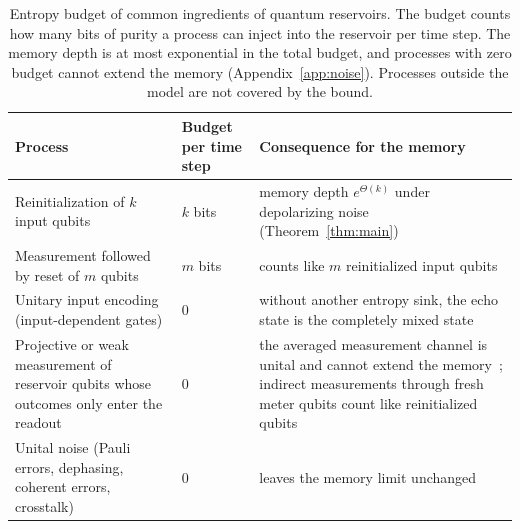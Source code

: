 \documentclass[aps,pra,reprint,superscriptaddress,floatfix]{revtex4-2}
\theoremstyle{plain}
\begin{document}
\begin{table}[t]
\caption{Entropy budget of common ingredients of quantum reservoirs. The budget counts how many bits of purity a process can inject into the reservoir per time step. The memory depth is at most exponential in the total budget, and processes with zero budget cannot extend the memory (Appendix~\ref{app:noise}). Processes outside the model are not covered by the bound.}
\label{tab:budget}
\begin{ruledtabular}
\begin{tabular}{p{5.5cm}p{2.8cm}p{7.9cm}}
{\raggedright Process\par} & {\raggedright Budget per time step\par} & {\raggedright Consequence for the memory\par} \\ \hline
{\raggedright Reinitialization of $k$ input qubits\par} & {\raggedright $k$ bits\par} & {\raggedright memory depth $e^{\Theta(k)}$ under depolarizing noise (Theorem~\ref{thm:main})\par} \\
{\raggedright Measurement followed by reset of $m$ qubits\par} & {\raggedright $m$ bits\par} & {\raggedright counts like $m$ reinitialized input qubits~\cite{Yasuda2023,Hu2024}\par} \\
{\raggedright Unitary input encoding (input-dependent gates)\par} & {\raggedright 0\par} & {\raggedright without another entropy sink, the echo state is the completely mixed state\par} \\
{\raggedright Projective or weak measurement of reservoir qubits whose outcomes only enter the readout\par} & {\raggedright 0\par} & {\raggedright the averaged measurement channel is unital and cannot extend the memory~\cite{Mujal2023}; indirect measurements through fresh meter qubits count like reinitialized qubits~\cite{MorguiSancho2026}\par} \\
{\raggedright Unital noise (Pauli errors, dephasing, coherent errors, crosstalk)\par} & {\raggedright 0\par} & {\raggedright leaves the memory limit unchanged\par} \\

\end{tabular}
\end{ruledtabular}
\end{table}
\end{document}
